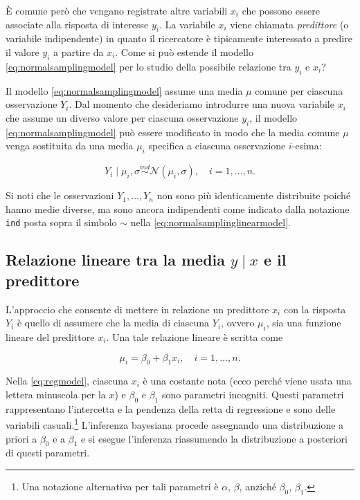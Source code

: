 \documentclass[
  11pt,
]{krantz}
\theoremstyle{definition}
\theoremstyle{definition}
\theoremstyle{definition}
\theoremstyle{definition}
\theoremstyle{remark}
\begin{document}
È comune però che vengano registrate altre variabili \(x_i\) che possono essere associate alla risposta di interesse \(y_i\). La variabile \(x_i\) viene chiamata \emph{predittore} (o variabile indipendente) in quanto il ricercatore è tipicamente interessato a predire il valore \(y_i\) a partire da \(x_i\). Come si può estende il modello \eqref{eq:normalsamplingmodel} per lo studio della possibile relazione tra \(y_i\) e \(x_i\)?

Il modello \eqref{eq:normalsamplingmodel} assume una media \(\mu\) comune per ciascuna osservazione \(Y_i\). Dal momento che desideriamo introdurre una nuova variabile \(x_i\) che assume un diverso valore per ciascuna osservazione \(y_i\), il modello \eqref{eq:normalsamplingmodel} può essere modificato in modo che la media comune \(\mu\) venga sostituita da una media \(\mu_i\) specifica a ciascuna osservazione \(i\)-esima:

\begin{equation}
Y_i \mid \mu_i, \sigma \stackrel{ind}{\sim} \mathcal{N}(\mu_i, \sigma), \quad i = 1, \dots, n.
\label{eq:normalsamplinglinearmodel}
\end{equation}

Si noti che le osservazioni \(Y_1, \dots, Y_n\) non sono più identicamente distribuite poiché hanno medie diverse, ma sono ancora indipendenti come indicato dalla notazione \texttt{ind} posta sopra il simbolo \(\sim\) nella \eqref{eq:normalsamplinglinearmodel}.

\hypertarget{relazione-lineare-tra-la-media-y-mid-x-e-il-predittore}{%
\subsection{\texorpdfstring{Relazione lineare tra la media \(y \mid x\) e il predittore}{Relazione lineare tra la media y \textbackslash mid x e il predittore}}\label{relazione-lineare-tra-la-media-y-mid-x-e-il-predittore}}

L'approccio che consente di mettere in relazione un predittore \(x_i\) con la risposta \(Y_i\) è quello di assumere che la media di ciascuna \(Y_i\), ovvero \(\mu_i\), sia una funzione lineare del predittore \(x_i\). Una tale relazione lineare è scritta come

\begin{equation}
\mu_i = \beta_0 + \beta_ 1 x_i, \quad i = 1, \dots, n.
\label{eq:regmodel}
\end{equation}

Nella \eqref{eq:regmodel}, ciascuna \(x_i\) è una costante nota (ecco perché viene usata una lettera minuscola per la \(x\)) e \(\beta_0\) e \(\beta_ 1\) sono parametri incogniti. Questi parametri rappresentano l'intercetta e la pendenza della retta di regressione e sono delle variabili casuali.\footnote{Una notazione alternativa per tali parametri è \(\alpha\), \(\beta\), anziché \(\beta_0\), \(\beta_ 1\).} L'inferenza bayesiana procede assegnando una distribuzione a priori a \(\beta_0\) e a \(\beta_ 1\) e si esegue l'inferenza riassumendo la distribuzione a posteriori di questi parametri.
\end{document}
